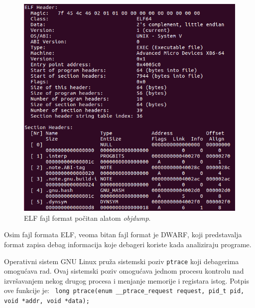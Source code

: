 \documentclass[12pt,oneside]{memoir}
\begin{document}
\begin{figure}[h!]
	\begin{center}
		\includegraphics[scale=0.5]{slike/elf_example.png}
	\end{center}
	\caption{ELF fajl format počitan alatom \emph{objdump}.}
	\label{fig:elf}
\end{figure}

Osim fajl formata ELF, veoma bitan fajl format je DWARF, koji predstavalja format zapisa debag informacija koje debageri koriste kada analiziraju programe.

Operativni sistem GNU Linux pruža sistemski poziv \texttt{ptrace} \cite{ptrace} koji debagerima omogućava rad. Ovaj sistemski poziv omogućava jednom procesu kontrolu nad izvršavanjem nekog drugog procesa i menjanje memorije i registara istog.
Potpis ove funkcije je:
\newline\newline
\texttt{ long ptrace(enum \_\_ptrace\_request request, pid\_t pid, void *addr, void *data);}
\newline
\end{document}
